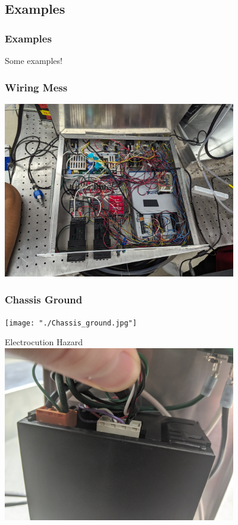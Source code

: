 \documentclass{presentation}
\begin{document}
\subsection{Examples}

\begin{frame}\frametitle{Examples}
  \huge
  Some examples!
\end{frame}

\begin{frame}\frametitle{Wiring Mess}
  \centering
  \includegraphics[width=4in]{"./wiring-mess.jpg"}
\end{frame}

\begin{frame}\frametitle{Chassis Ground}
  \centering
  \texttt{[image: "./Chassis\_ground.jpg"]}
\end{frame}

\begin{frame}{Electrocution Hazard}
  \centering
  \includegraphics[height=3in]{"./IMG_20200106_153053.jpg"}
\end{frame}
\end{document}
